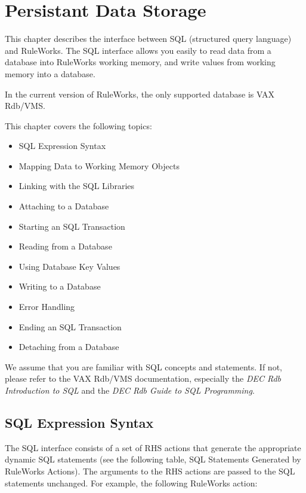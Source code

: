 \chapter{Persistant Data Storage}

This chapter describes the interface between SQL (structured query
language) and RuleWorks. The SQL interface allows you easily to read
data from a database into RuleWorks working memory, and write values
from working memory into a database.

\begin{note}
  In the current version of RuleWorks, the only supported database is
  VAX Rdb/VMS.
\end{note}

This chapter covers the following topics:

\begin{itemize}
\item SQL Expression Syntax
\item Mapping Data to Working Memory Objects
\item Linking with the SQL Libraries
\item Attaching to a Database
\item Starting an SQL Transaction
\item Reading from a Database
\item Using Database Key Values
\item Writing to a Database
\item Error Handling
\item Ending an SQL Transaction
\item Detaching from a Database
\end{itemize}

We assume that you are familiar with SQL concepts and statements. If
not, please refer to the VAX Rdb/VMS documentation, especially the
\emph{DEC Rdb Introduction to SQL} and the \emph{DEC Rdb Guide to SQL
  Programming}.

\section{SQL Expression Syntax}

The SQL interface consists of a set of RHS actions that generate the
appropriate dynamic SQL statements (see the following table, SQL
Statements Generated by RuleWorks Actions).  The arguments to the RHS
actions are passed to the SQL statements unchanged. For example, the
following RuleWorks action:

